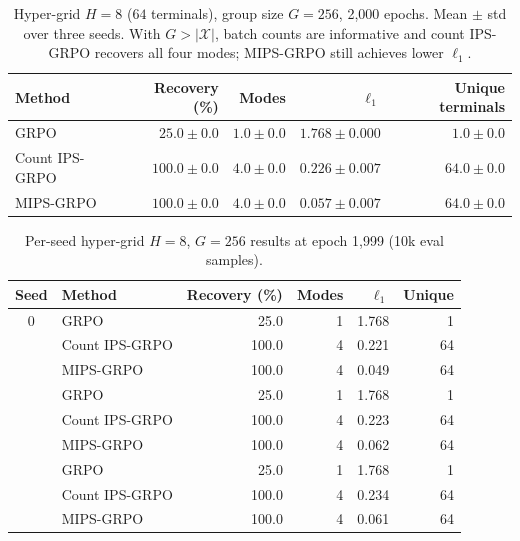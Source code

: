 \begin{table}[htbp]
\centering
\caption{Hyper-grid $H=8$ ($64$ terminals), group size $G=256$, 2{,}000 epochs.
Mean $\pm$ std over three seeds. With $G > |\mathcal{X}|$, batch counts are
informative and count IPS-GRPO recovers all four modes; MIPS-GRPO still achieves
lower $\ell_1$.}
\label{tab:grid-b256}
\begin{tabular}{lrrrr}
\toprule
Method & Recovery (\%) & Modes & $\ell_1$ & Unique terminals \\
\midrule
GRPO           & $25.0 \pm 0.0$ & $1.0 \pm 0.0$ & $1.768 \pm 0.000$ & $1.0 \pm 0.0$ \\
Count IPS-GRPO & $100.0 \pm 0.0$ & $4.0 \pm 0.0$ & $0.226 \pm 0.007$ & $64.0 \pm 0.0$ \\
MIPS-GRPO      & $100.0 \pm 0.0$ & $4.0 \pm 0.0$ & $0.057 \pm 0.007$ & $64.0 \pm 0.0$ \\
\bottomrule
\end{tabular}
\end{table}

\begin{table}[htbp]
\centering
\caption{Per-seed hyper-grid $H=8$, $G=256$ results at epoch 1{,}999 (10k eval
samples).}
\label{tab:grid-b256-seeds}
\small
\begin{tabular}{clrrrr}
\toprule
Seed & Method & Recovery (\%) & Modes & $\ell_1$ & Unique \\
\midrule
0 & GRPO           & 25.0 & 1 & 1.768 & 1 \\
  & Count IPS-GRPO & 100.0 & 4 & 0.221 & 64 \\
  & MIPS-GRPO      & 100.0 & 4 & 0.049 & 64 \\
\addlinespace
1 & GRPO           & 25.0 & 1 & 1.768 & 1 \\
  & Count IPS-GRPO & 100.0 & 4 & 0.223 & 64 \\
  & MIPS-GRPO      & 100.0 & 4 & 0.062 & 64 \\
\addlinespace
2 & GRPO           & 25.0 & 1 & 1.768 & 1 \\
  & Count IPS-GRPO & 100.0 & 4 & 0.234 & 64 \\
  & MIPS-GRPO      & 100.0 & 4 & 0.061 & 64 \\
\bottomrule
\end{tabular}
\end{table}
